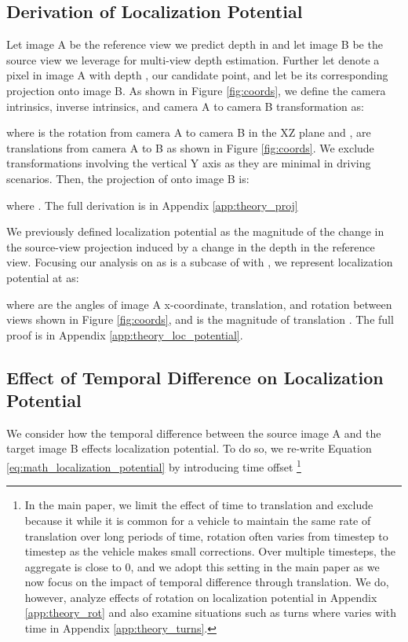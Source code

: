 \documentclass[runningheads, hyperfootnotes=false]{article}
\begin{document}
\subsection{Derivation of Localization Potential}
Let image A be the reference view we predict depth in and let image B be the source view we leverage for multi-view depth estimation. Further let  denote a pixel  in image A with depth , our candidate point, and let  be its corresponding projection onto image B. As shown in Figure \ref{fig:coords}, we define the camera intrinsics, inverse intrinsics, and camera A to camera B transformation as:

where  is the rotation from camera A to camera B in the XZ plane and ,  are translations from camera A to B as shown in Figure \ref{fig:coords}. We exclude transformations involving the vertical Y axis as they are minimal in driving scenarios. Then, the projection of  onto image B is:

where . The full derivation is in Appendix \ref{app:theory_proj}

We previously defined localization potential as the magnitude of the change in the source-view projection induced by a change in the depth in the reference view. Focusing our analysis on  as  is a subcase of  with , we represent localization potential at  as:

where  are the angles of image A x-coordinate, translation, and rotation between views shown in Figure \ref{fig:coords}, and  is the magnitude of translation .
The full proof is in Appendix \ref{app:theory_loc_potential}.

\subsection{Effect of Temporal Difference on Localization Potential}
We consider how the temporal difference between the source image A and the target image B effects localization potential. To do so, we re-write Equation \ref{eq:math_localization_potential} by introducing time offset \footnote{In the main paper, we limit the effect of time to translation and exclude  because it while it is common for a vehicle to maintain the same rate of translation over long periods of time, rotation often varies from timestep to timestep as the vehicle makes small corrections. Over multiple timesteps, the aggregate  is close to 0, and we adopt this setting in the main paper as we now focus on the impact of temporal difference through translation. We do, however, analyze effects of rotation on localization potential in Appendix \ref{app:theory_rot} and also examine situations such as turns where  varies with time in Appendix \ref{app:theory_turns}.}
\end{document}
